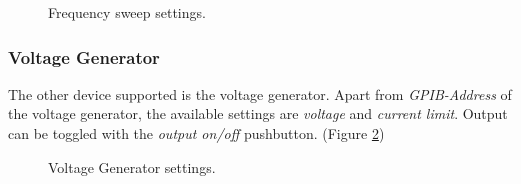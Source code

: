 \begin{figure}[H]
\centering
{}
\caption{Frequency sweep settings.}
\label{fig:freqsw}
\end{figure}

\subsubsection*{Voltage Generator}
The other device supported is the voltage generator. Apart from \emph{GPIB-Address} of the voltage generator, the available settings are \emph{voltage} and \emph{current limit}. Output can be toggled with the \emph{output on/off} pushbutton. (Figure \ref{fig:voltgen})

\begin{figure}[H]
\centering
{}
\caption{Voltage Generator settings.}
\label{fig:voltgen}
\end{figure}

\ifdefined\master
\else
	
\fi